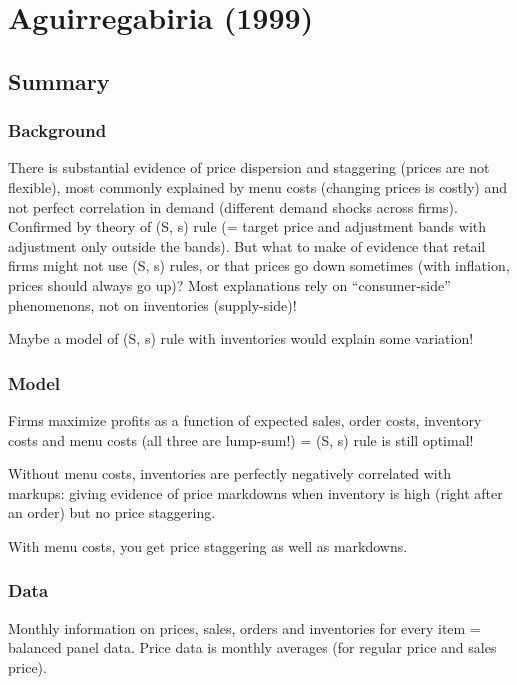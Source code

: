 \section{Aguirregabiria (1999)}

\subsection{Summary}

\subsubsection{Background}

There is substantial evidence of price dispersion and staggering (prices are not flexible), most commonly explained by menu costs (changing prices is costly) and not perfect correlation in demand (different demand shocks across firms). Confirmed by theory of (S, s) rule (= target price and adjustment bands with adjustment only outside the bands). But what to make of evidence that retail firms might not use (S, s) rules, or that prices go down sometimes (with inflation, prices should always go up)? Most explanations rely on ``consumer-side'' phenomenons, not on inventories (supply-side)!

Maybe a model of (S, s) rule with inventories would explain some variation!

\subsubsection{Model}

Firms maximize profits as a function of expected sales, order costs, inventory costs and menu costs (all three are lump-sum!) = (S, s) rule is still optimal!

Without menu costs, inventories are perfectly negatively correlated with markups: giving evidence of price markdowns when inventory is high (right after an order) but no price staggering.

With menu costs, you get price staggering as well as markdowns.

\subsubsection{Data}

Monthly information on prices, sales, orders and inventories for every item = balanced panel data. Price data is monthly averages (for regular price and sales price).

